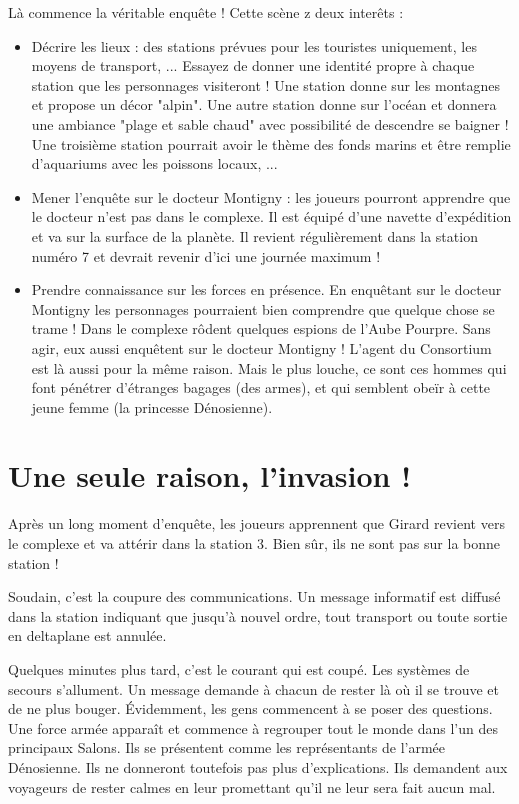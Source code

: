 \begin{multicols*}{2}
Là commence la véritable enquête ! Cette scène z deux interêts :
\begin{itemize}
\item Décrire les lieux : des stations prévues pour les touristes uniquement, les moyens de transport, ... Essayez de donner une identité propre à chaque station que les personnages visiteront ! Une station donne sur les montagnes et propose un décor "alpin". Une autre station donne sur l'océan et donnera une ambiance "plage et sable chaud" avec possibilité de descendre se baigner ! Une troisième station pourrait avoir le thème des fonds marins et être remplie d'aquariums avec les poissons locaux, ...
\item Mener l'enquête sur le docteur Montigny : les joueurs pourront apprendre que le docteur n'est pas dans le complexe. Il est équipé d'une navette d'expédition et va sur la surface de la planète. Il revient régulièrement dans la station numéro 7 et devrait revenir d'ici une journée maximum !
\item Prendre connaissance sur les forces en présence. En enquêtant sur le docteur Montigny les personnages pourraient bien comprendre que quelque chose se trame ! Dans le complexe rôdent quelques espions de l'Aube Pourpre. Sans agir, eux aussi enquêtent sur le docteur Montigny ! L'agent du Consortium est là aussi pour la même raison. Mais le plus louche, ce sont ces hommes qui font pénétrer d'étranges bagages (des armes), et qui semblent obeïr à cette jeune femme (la princesse Dénosienne).
\end{itemize}

\section{Une seule raison, l'invasion !}

Après un long moment d'enquête, les joueurs apprennent que Girard revient vers le complexe et va attérir dans la station 3. Bien sûr, ils ne sont pas sur la bonne station ! 

Soudain, c'est la coupure des communications. Un message informatif est diffusé dans la station indiquant que jusqu'à nouvel ordre, tout transport ou toute sortie en deltaplane est annulée. 

Quelques minutes plus tard, c'est le courant qui est coupé. Les systèmes de secours s'allument. Un message demande à chacun de rester là où il se trouve et de ne plus bouger. Évidemment, les gens commencent à se poser des questions. Une force armée apparaît et commence à regrouper tout le monde dans l'un des principaux Salons. Ils se présentent comme les représentants de l'armée Dénosienne. Ils ne donneront toutefois pas plus d'explications. Ils demandent aux voyageurs de rester calmes en leur promettant qu'il ne leur sera fait aucun mal.


\end{multicols*}
